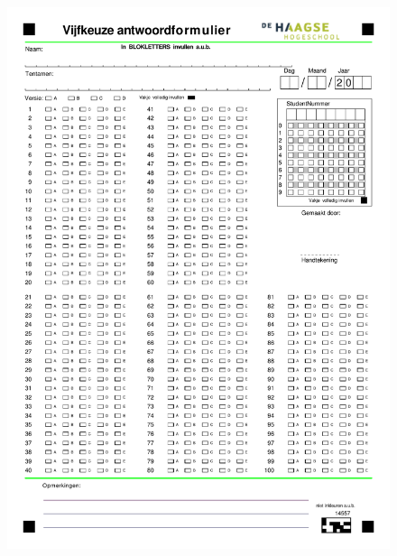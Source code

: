 \documentclass[a4paper,12pt,fleqn,dutch]{tisdexam}
\begin{document}
\begin{figure}[h!]
  \centering
  \includegraphics*[viewport=0 500 600 850,scale=0.80]{vijfkeuze_nl.pdf}
\end{figure}
\centering{***********************************************************}
\end{document}
